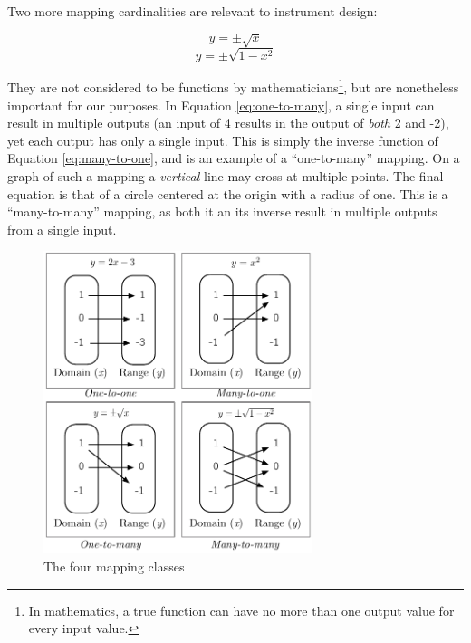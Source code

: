 Two more mapping cardinalities are relevant to instrument design:  

\begin{equation} y = \pm\sqrt{x} \label{eq:one-to-many} \end{equation} 
\begin{equation} y = \pm\sqrt{1 - x^2} \label{eq:many-to-many} \end{equation} 

They are not considered to be functions by mathematicians\footnote{In mathematics, a true function can have no more than one output value for every input value.}, but are nonetheless important for our purposes. In Equation \ref{eq:one-to-many}, a single input can result in multiple outputs (an input of 4 results in the output of \emph{both} 2 and -2), yet each output has only a single input. This is simply the inverse function of Equation \ref{eq:many-to-one}, and is an example of a ``one-to-many'' mapping. On a graph of such a mapping a \emph{vertical} line may cross at multiple points. The final equation is that of a circle centered at the origin with a radius of one. This is a ``many-to-many'' mapping, as both it an its inverse result in multiple outputs from a single input.


\begin{figure}[h]
\centering
	\includegraphics[width=0.7\textwidth]{figures/types_of_mapping}
\caption{The four mapping classes}
\label{fig:types_of_mapping}
\end{figure}

